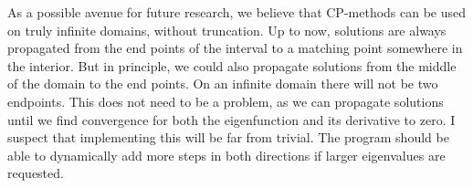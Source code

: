 As a possible avenue for future research, we believe that CP-methods can be used on truly infinite domains, without truncation. Up to now, solutions are always propagated from the end points of the interval to a matching point somewhere in the interior. But in principle, we could also propagate solutions from the middle of the domain to the end points. On an infinite domain there will not be two endpoints. This does not need to be a problem, as we can propagate solutions until we find convergence for both the eigenfunction and its derivative to zero. I suspect that implementing this will be far from trivial. The program should be able to dynamically add more steps in both directions if larger eigenvalues are requested.

\stopchapter
